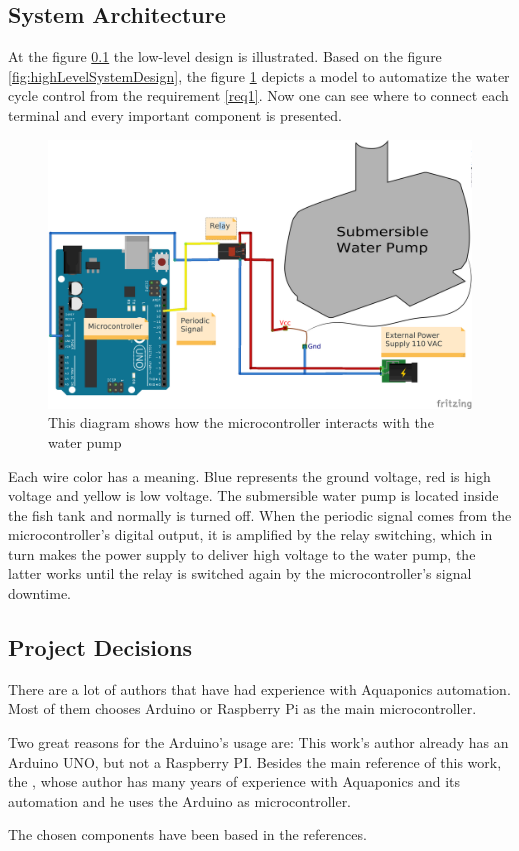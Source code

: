 \subsection{System Architecture}
\label{sec:architecture}

At the figure \ref{sec:architecture} the low-level design is illustrated.
Based on the figure \ref{fig:highLevelSystemDesign},
the figure \ref{fig:waterCycleDiagram} depicts a model to automatize the water cycle control from the requirement \ref{req1}.
Now one can see where to connect each terminal and every important component is presented.

\begin{figure}[h]
    \centering
    \includegraphics[width=.6\linewidth]{diagrams/architecture_bb}
    \caption{This diagram shows how the microcontroller interacts with the water pump}
    \label{fig:waterCycleDiagram}
\end{figure}

Each wire color has a meaning.
Blue represents the ground voltage,
red is high voltage
and yellow is low voltage.
The submersible water pump is located inside the fish tank and normally is turned off.
When the periodic signal comes from the microcontroller's digital output,
it is amplified by the relay switching,
which in turn makes the power supply to deliver high voltage to the water pump,
the latter works until the relay is switched again by the microcontroller's signal downtime.

\subsection{Project Decisions}
There are a lot of authors \cite{GoddekDelaideMankasinghEtAl2015} \cite{clark2009system} \cite{Leatherbury2014} that have had experience with Aquaponics automation.
Most of them chooses Arduino or Raspberry Pi as the main microcontroller.

Two great reasons for the Arduino's usage are:
This work's author already has an Arduino UNO,
but not a Raspberry PI.
Besides the main reference of this work,
the \cite{Kretzinger2015},
whose author has many years of experience with Aquaponics and its automation and he uses the Arduino as microcontroller.

The chosen components have been based in the references.

